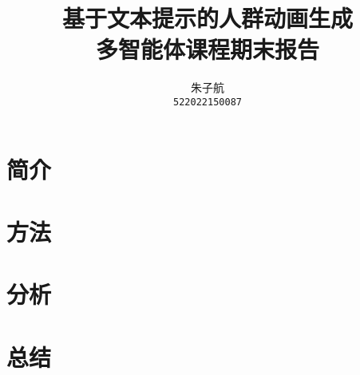 \documentclass{si_template/cn_note}
\title{\Huge 基于文本提示的人群动画生成 \\ \huge 多智能体课程期末报告}
\author{\hspace{1mm}朱子航\\\texttt{522022150087}}
\begin{document}
\maketitle
\section{简介}\label{sec:introduction}

\section{方法}\label{sec:method}

\section{分析}\label{sec:analysis}

\section{总结}\label{sec:conclusion}

\end{document}
